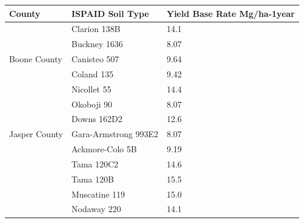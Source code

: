 \documentclass[11pt]{article}
\begin{document}
\begin{table}[H]
\centering
\begin{tabular}{|l|l|l|l|l|l|}
\hline
\multicolumn{2}{|l|}{County}                  & \multicolumn{2}{|l|}{ISPAID Soil Type} & \multicolumn{2}{|l|}{Yield Base Rate Mg/ha-1year} \\ 
\hline
\multicolumn{2}{|l|}{\multirow{5}{*}{Boone County}} & \multicolumn{2}{|l|}{Clarion 138B} & \multicolumn{2}{|l|}{14.1} \\ 
\cline{3-6} 
\multicolumn{2}{|l|}{}                  & \multicolumn{2}{|l|}{Buckney 1636} & \multicolumn{2}{|l|}{8.07} \\ 
\cline{3-6} 
\multicolumn{2}{|l|}{}                  & \multicolumn{2}{|l|}{Canisteo 507} & \multicolumn{2}{|l|}{9.64} \\ 
\cline{3-6} 
\multicolumn{2}{|l|}{}                  & \multicolumn{2}{|l|}{Coland 135} & \multicolumn{2}{|l|}{9.42} \\ 
\cline{3-6} 
\multicolumn{2}{|l|}{}                  & \multicolumn{2}{|l|}{Nicollet 55} & \multicolumn{2}{|l|}{14.4} \\ 
\cline{3-6}
\multicolumn{2}{|l|}{}                  & \multicolumn{2}{|l|}{Okoboji 90} & \multicolumn{2}{|l|}{8.07} \\ 
\hline
\multicolumn{2}{|l|}{\multirow{3}{*}{Jasper County}} & \multicolumn{2}{|l|}{Downs 162D2} & \multicolumn{2}{|l|}{12.6} \\ 
\cline{3-6} 
\multicolumn{2}{|l|}{}                  & \multicolumn{2}{|l|}{Gara-Armstrong 993E2} & \multicolumn{2}{|l|}{8.07} \\ 
\cline{3-6} 
\multicolumn{2}{|l|}{}                  & \multicolumn{2}{|l|}{Ackmore-Colo 5B} & \multicolumn{2}{|l|}{9.19} \\ 
\cline{3-6} 
\multicolumn{2}{|l|}{}                  & \multicolumn{2}{|l|}{Tama 120C2} & \multicolumn{2}{|l|}{14.6} \\ 
\cline{3-6} 
\multicolumn{2}{|l|}{}                  & \multicolumn{2}{|l|}{Tama 120B} & \multicolumn{2}{|l|}{15.5} \\ 
\cline{3-6} 
\multicolumn{2}{|l|}{}                  & \multicolumn{2}{|l|}{Muscatine 119} & \multicolumn{2}{|l|}{15.0} \\ 
\cline{3-6} 
\multicolumn{2}{|l|}{}                  & \multicolumn{2}{|l|}{Nodaway 220} & \multicolumn{2}{|l|}{14.1} \\ 
\hline
\end{tabular}
\end{table}
\end{document}
